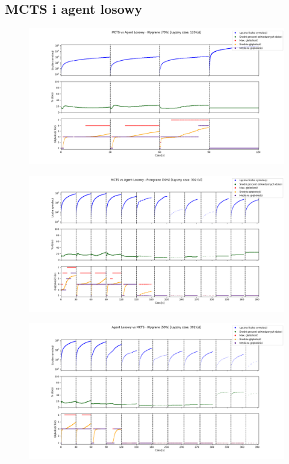   \pagebreak
  \subsection{MCTS i agent losowy}

    \begin{figure}[H]
        \center
        \includegraphics[width=\textwidth]{imgs/plots/MCTS_RA_WIN.png}
    \end{figure}

    \begin{figure}[H]
        \center
        \includegraphics[width=\textwidth]{imgs/plots/MCTS_RA_LOST.png}
    \end{figure}

    \begin{figure}[H]
        \center
        \includegraphics[width=\textwidth]{imgs/plots/RA_MCTS_WIN.png}
    \end{figure}

